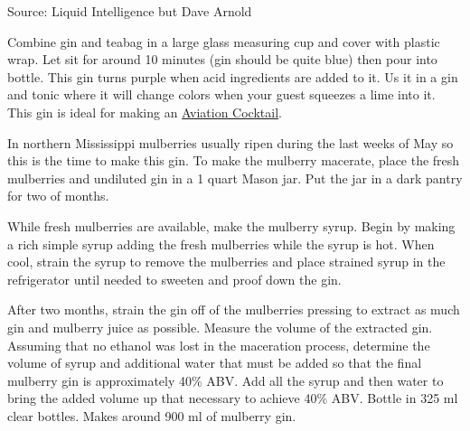 \documentclass[letterpaper]{recipePMG}
\begin{document}
Source: Liquid Intelligence but Dave Arnold

\label{CeruleanGin}

Combine gin and teabag in a large glass measuring cup and cover with plastic wrap.  Let sit for around 10 minutes (gin should be quite blue) then pour into bottle. This gin turns purple when acid ingredients are added to it. Us it in a gin and tonic where it will change colors when your guest squeezes a lime into it. This gin is ideal for making an \hyperref[Aviation]{Aviation Cocktail}.

\newpage

 \label{MulberryGin}
 
 

 
 In northern Mississippi mulberries usually ripen during the last weeks of May so this is the time to make this gin. To make the mulberry macerate, place the fresh mulberries and undiluted gin in a 1 quart Mason jar. Put the jar in a dark pantry for two of months. 
 
 While fresh mulberries are available, make the mulberry syrup. Begin by making a rich simple syrup adding the fresh mulberries while the syrup is hot. When cool, strain the syrup to remove the mulberries and place strained syrup in the refrigerator until needed to sweeten and proof down the gin.
 
 After two months, strain the gin off of the mulberries pressing to extract as much gin and mulberry juice as possible.  Measure the volume of the extracted gin.  Assuming that no ethanol was lost in the maceration process, determine the volume of syrup and additional water that must be added so that the final mulberry gin is approximately 40\% ABV. Add all the syrup and then water to bring the added volume up that necessary to achieve 40\% ABV. Bottle in 325 ml clear bottles. Makes around 900 ml of mulberry gin.
 
\newpage 
\end{document}
